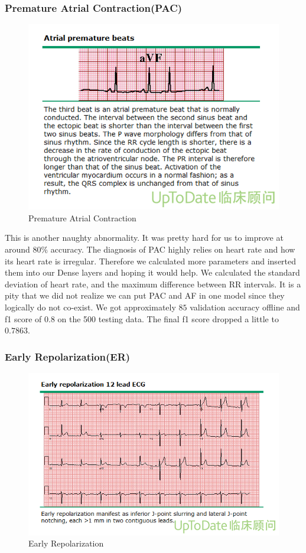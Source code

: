\documentclass[runningheads]{llncs}
\begin{document}
\subsubsection{Premature Atrial Contraction(PAC)}
\begin{figure}[H]
	\includegraphics[width=\linewidth]{img/PAC.png}
	\caption{\label{fig:PAC} Premature Atrial Contraction \cite{UptoDate}}
\end{figure}
This is another naughty abnormality. It was pretty hard for us to improve at around $80\%$ accuracy. The diagnosis of PAC highly relies on heart rate and how its heart rate is irregular. Therefore we calculated more parameters and inserted them into our Dense layers and hoping it would help. We calculated the standard deviation of heart rate, and the maximum difference between RR intervals. 
It is a pity that we did not realize we can put PAC and AF in one model since they logically do not co-exist. 
We got approximately $85$ validation accuracy offline and f1 score of $0.8$ on the 500 testing data. The final f1 score dropped a little to $0.7863$.

\subsubsection{Early Repolarization(ER)}
\begin{figure}[H]
	\includegraphics[width=\linewidth]{img/ER.png}
	\caption{\label{fig:ER} Early Repolarization \cite{UptoDate}}
\end{figure}
\end{document}
